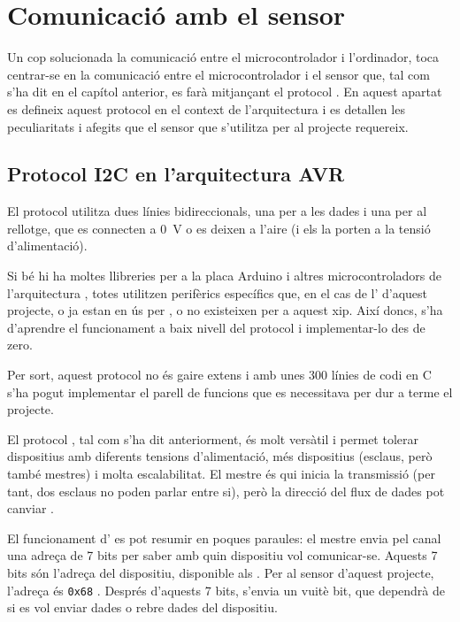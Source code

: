 \section{Comunicació amb el sensor}

Un cop solucionada la comunicació entre el microcontrolador i l'ordinador, toca
centrar-se en la comunicació entre el microcontrolador i el sensor que, tal
com s'ha dit en el capítol anterior, es farà mitjançant el protocol .
En aquest apartat es defineix aquest protocol en el context de l'arquitectura
 i es detallen les peculiaritats i afegits que el sensor que
s'utilitza per al projecte requereix.

\subsection{Protocol I2C en l'arquitectura AVR}

El protocol  utilitza dues línies bidireccionals, una per a les dades 
i una per al rellotge, que es connecten a 
\SI[round-mode=places,round-precision=0]{0}{\volt} o es deixen a l'aire (i els 
 la porten a la tensió d'alimentació).

Si bé hi ha moltes llibreries per a la placa Arduino i altres microcontroladors
de l'arquitectura , totes utilitzen perifèrics específics que, en el
cas de l' d'aquest projecte, o ja estan en ús per , o
no existeixen per a aquest xip. Així doncs, s'ha d'aprendre el funcionament a
baix nivell del protocol i implementar-lo des de zero.

Per sort, aquest protocol no és gaire extens i amb unes 300 línies de codi en C
s'ha pogut implementar el parell de funcions que es necessitava per dur a
terme el projecte.

El protocol , tal com s'ha dit anteriorment, és molt versàtil i permet 
tolerar dispositius amb diferents tensions d'alimentació, més dispositius
(esclaus, però també mestres) i molta escalabilitat. El mestre és qui inicia
la transmissió (per tant, dos esclaus no poden parlar entre si), però la
direcció del flux de dades pot canviar \cite{I2c}.

El funcionament d' es pot resumir en poques paraules: el mestre envia
pel canal una adreça de 7 bits per saber amb quin dispositiu vol comunicar-se.
Aquests 7 bits són l'adreça del dispositiu, disponible als . Per
al sensor d'aquest projecte, l'adreça és \texttt{0x68} \cite{MPU6050reg}.
Després d'aquests 7 bits,
s'envia un vuitè bit, que dependrà de si es vol enviar dades o rebre dades del
dispositiu.

